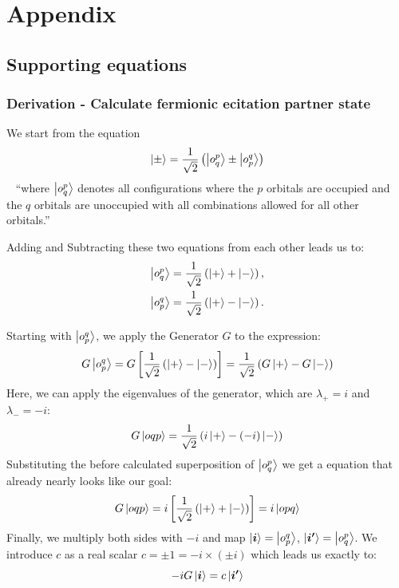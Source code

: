 \chapter{Appendix}
\label{c:appendix}

\section{Supporting equations}
\subsection{Derivation - Calculate fermionic ecitation partner state}\label{subsec:derivation---calculate-fermionic-ecitation-partner-state}
We start from the equation
\begin{equation}
    \ket{\pm} = \frac{1}{\sqrt{2}} \left( \ket{o^p_q} \pm \ket{o^q_p} \right)
\end{equation}~\cite[Appendix - Eigenstates of fermionic generators]{kottmann2020feasible}
``where $\ket{o^p_q}$ denotes all configurations where the $p$ orbitals are occupied and the $q$ orbitals are unoccupied with all combinations allowed for all other orbitals.''~\cite[Chapter II.E.1]{kottmann2020feasible}

Adding and Subtracting these two equations from each other leads us to:
\begin{align}
    \ket{o^p_q} = \frac{1}{\sqrt{2}} \left( \ket{+} + \ket{-} \right), \\
    \ket{o^q_p} = \frac{1}{\sqrt{2}} \left( \ket{+} - \ket{-} \right).
\end{align}

Starting with $\ket{o^q_p}$, we apply the Generator $G$ to the expression:
\begin{equation}
    G\ket{o^q_p} = G \left[ \frac{1}{\sqrt{2}} \left( \ket{+} - \ket{-} \right) \right] = \frac{1}{\sqrt{2}} \left( G\ket{+} - G\ket{-} \right)
\end{equation}
Here, we can apply the eigenvalues of the generator, which are $\lambda_+ = i$ and $\lambda_- = -i$:
\begin{equation}
    G\ket{oqp} = \frac{1}{\sqrt{2}} \left( i\ket{+} - (-i)\ket{-} \right)
\end{equation}
Substituting the before calculated superposition of $\ket{o^p_q}$ we get a equation that already nearly looks like our goal:
\begin{equation}
    G\ket{oqp} = i \left[ \frac{1}{\sqrt{2}} \left( \ket{+} + \ket{-} \right) \right] = i\ket{opq}
\end{equation}
Finally, we multiply both sides with $-i$ and map $\ket{\boldsymbol{i}} = \ket{o^q_p}$, $\ket{\boldsymbol{i'}} = \ket{o^p_q}$.
We introduce $c$ as a real scalar $c = \pm1 = -i \times (\pm i)$ which leads us exactly to:
\begin{equation}
    -iG\ket{\boldsymbol{i}} = c\ket{\boldsymbol{i'}}
\end{equation}

